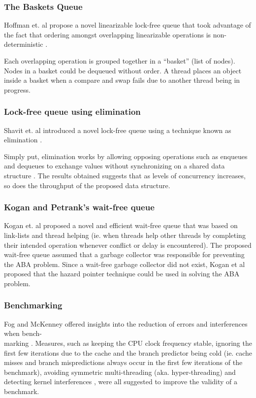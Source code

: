 \documentclass[a4paper, 12pt, titlepage]{article}
\begin{document}
\begin{singlespace}
\subsubsection{The Baskets Queue}
Hoffman et. al propose a novel linearizable lock-free queue that took advantage of the fact that ordering amongst overlapping linearizable operations is non-deterministic \cite{hoffman2007baskets}. 

Each overlapping operation is grouped together in a ``basket'' (list of nodes). Nodes in a basket could be dequeued without order. A thread places an object inside a basket when a compare and swap fails due to another thread being in progress.

\subsubsection{Lock-free queue using elimination}
Shavit et. al introduced a novel lock-free queue using a technique known as elimination \cite{moir2005using}. 

Simply put, elimination works by allowing opposing operations such as enqueues and dequeues to exchange values without synchronizing on a shared data structure \cite{shavit1997elimination, moir2005using}. The results obtained suggests that as levels of concurrency increases, so does the throughput of the proposed data structure.

\subsubsection{Kogan and Petrank's wait-free queue}
\label{kp-queue}

Kogan et. al proposed a novel and efficient wait-free queue that was based on link-lists and thread helping (ie. when threads help other threads by completing their intended operation whenever conflict or delay is encountered)\cite{kogan2011wait}.
The proposed wait-free queue assumed that a garbage collector was responsible for preventing the ABA problem. Since a wait-free garbage collector did not exist, Kogan et al proposed that the hazard pointer technique could be used in solving the ABA problem.
\subsubsection{Benchmarking}
Fog and McKenney offered insights into the reduction of errors and interferences when bench-\\marking \cite{fog1996optimizing,fog2020optimizing, mckenney2017parallel}. Measures, such as keeping the CPU clock frequency stable, ignoring the first few iterations due to the cache and the branch predictor being cold\cite{fog1996optimizing} (ie. cache misses and branch mispredictions always occur in the first few iterations of the benchmark), avoiding symmetric multi-threading (aka. hyper-threading) \cite{fog2020optimizing} and detecting kernel interferences \cite[Chapter~11.7]{mckenney2017parallel}, were all suggested to improve the validity of a benchmark.


\end{singlespace}
\end{document}
